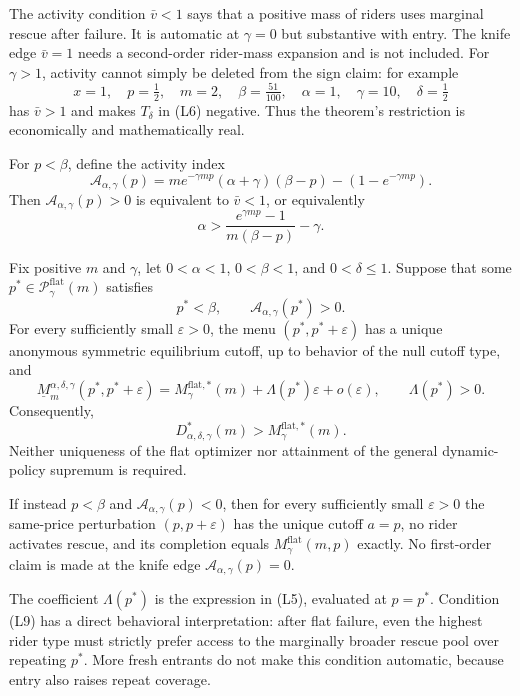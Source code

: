 \documentclass[mnsc,blindrev]{informs3}
\begin{document}
The activity condition $\bar v<1$ says that a positive mass of riders uses
marginal rescue after failure.  It is automatic at $\gamma=0$ but substantive
with entry.  The knife edge $\bar v=1$ needs a second-order rider-mass
expansion and is not included.  For $\gamma>1$, activity cannot simply be
deleted from the sign claim: for example
\[
 x=1,\quad p=\tfrac12,\quad m=2,\quad \beta=\tfrac{51}{100},
 \quad\alpha=1,\quad\gamma=10,\quad\delta=\tfrac12
\]
has $\bar v>1$ and makes $T_\delta$ in (L6) negative.  Thus the
theorem's restriction is economically and mathematically real.

For $p<\beta$, define the activity index
\[
 \mathcal A_{\alpha,\gamma}(p)
 =m e^{-\gamma mp}(\alpha+\gamma)(\beta-p)
  -(1-e^{-\gamma mp}).                                   \tag{L7}
\]
Then $\mathcal A_{\alpha,\gamma}(p)>0$ is equivalent to $\bar v<1$, or
equivalently
\[
 \alpha>
 \frac{e^{\gamma mp}-1}{m(\beta-p)}-\gamma.              \tag{L8}
\]

\begin{theorem}
\label{thm:optimizedflatentry}
Fix positive $m$ and $\gamma$, let $0<\alpha<1$, $0<\beta<1$, and
$0<\delta\le1$.  Suppose that some
$p^*\in\mathcal P_\gamma^{\mathrm{flat}}(m)$ satisfies
\[
 p^*<\beta,\qquad \mathcal A_{\alpha,\gamma}(p^*)>0.      \tag{L9}
\]
For every sufficiently small $\varepsilon>0$, the menu
$(p^*,p^*+\varepsilon)$ has a unique anonymous symmetric equilibrium cutoff,
up to behavior of the null cutoff type, and
\[
 \underline M_m^{\alpha,\delta,\gamma}
 (p^*,p^*+\varepsilon)
 =M_\gamma^{\mathrm{flat},*}(m)+\Lambda(p^*)\varepsilon+o(\varepsilon),
 \qquad \Lambda(p^*)>0.                                  \tag{L10}
\]
Consequently,
\[
 D_{\alpha,\delta,\gamma}^*(m)>M_\gamma^{\mathrm{flat},*}(m). \tag{L11}
\]
Neither uniqueness of the flat optimizer nor attainment of the general
dynamic-policy supremum is required.

If instead $p<\beta$ and $\mathcal A_{\alpha,\gamma}(p)<0$, then for every
sufficiently small $\varepsilon>0$ the same-price perturbation
$(p,p+\varepsilon)$ has the unique cutoff $a=p$, no rider activates rescue,
and its completion equals $M_\gamma^{\mathrm{flat}}(m,p)$ exactly.  No first-order claim is
made at the knife edge $\mathcal A_{\alpha,\gamma}(p)=0$.
\end{theorem}

The coefficient $\Lambda(p^*)$ is the expression in (L5), evaluated at
$p=p^*$.  Condition (L9) has a direct behavioral interpretation: after flat
failure, even the highest rider type must strictly prefer access to the
marginally broader rescue pool over repeating $p^*$.  More fresh entrants do
not make this condition automatic, because entry also raises repeat coverage.
\end{document}
